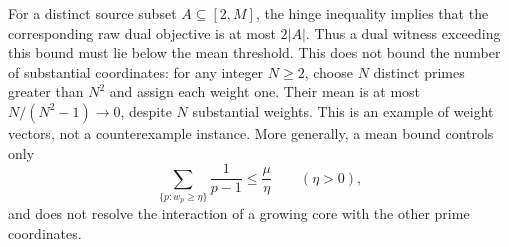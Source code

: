 For a distinct source subset $A\subseteq[2,M]$, the hinge inequality
implies that the corresponding raw dual objective is at most $2|A|$.
Thus a dual witness exceeding this bound must lie below the mean
threshold. This does not bound the number of substantial coordinates:
for any integer $N\ge2$, choose $N$ distinct primes greater than $N^2$
and assign each weight one. Their mean is at most $N/(N^2-1)\to0$,
despite $N$ substantial weights. This is an example of weight vectors,
not a counterexample instance. More generally, a mean bound controls only
\[
 \sum_{\{p:w_p\ge\eta\}}\frac1{p-1}\le\frac\mu\eta
 \qquad(\eta>0),
\]
and does not resolve the interaction of a growing core with the other
prime coordinates.
